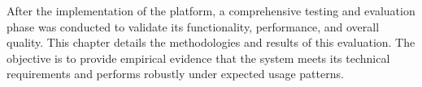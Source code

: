 After the implementation of the platform, a comprehensive testing and evaluation phase was conducted to validate its functionality, performance, and overall quality. This chapter details the methodologies and results of this evaluation. The objective is to provide empirical evidence that the system meets its technical requirements and performs robustly under expected usage patterns.